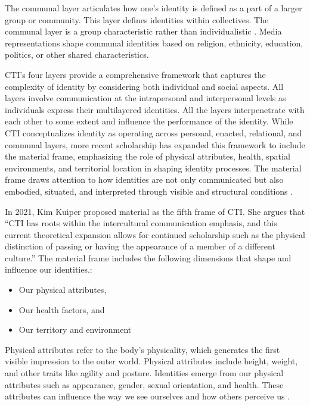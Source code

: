 The communal layer articulates how one’s identity is defined as a part of a larger group or community. This layer defines identities within collectives. The communal layer is a group characteristic rather than individualistic \citep{jungElaboratingCommunicationTheory2004}. Media representations shape communal identities based on religion, ethnicity, education, politics, or other shared characteristics. 

CTI's four layers provide a comprehensive framework that captures the complexity of identity by considering both individual and social aspects. All layers involve communication at the intrapersonal and interpersonal levels as individuals express their multilayered identities. All the layers interpenetrate with each other to some extent and influence the performance of the identity. While CTI conceptualizes identity as operating across personal, enacted, relational, and communal layers, more recent scholarship has expanded this framework to include the material frame, emphasizing the role of physical attributes, health, spatial environments, and territorial location in shaping identity processes. The material frame draws attention to how identities are not only communicated but also embodied, situated, and interpreted through visible and structural conditions \citep{kuiperCommunicationTheoryIdentity2021}.

In 2021, Kim Kuiper proposed material as the fifth frame of CTI. She argues that ``CTI has roots within the intercultural communication emphasis, and this current theoretical expansion allows for continued scholarship such as the physical distinction of passing or having the appearance of a member of a different culture.'' The material frame includes the following dimensions that shape and influence our identities.: 

\begin{itemize}
    \item Our physical attributes,
    \item Our health factors, and 
    \item Our territory and environment
\end{itemize}

Physical attributes refer to the body's physicality, which generates the first visible impression to the outer world. Physical attributes include height, weight, and other traits like agility and posture. Identities emerge from our physical attributes such as appearance, gender, sexual orientation, and health. These attributes can influence the way we see ourselves and how others perceive us \citep{kuiperCommunicationTheoryIdentity2021}.

